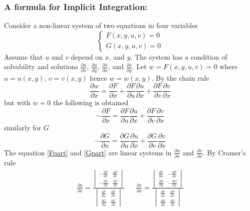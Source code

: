 \documentclass[14pt]{article}
\begin{document}
    \subsubsection{A formula for Implicit Integration:}
    Consider a non-linear system of two equations in four variables
    $$\left\{\begin{array}{lr}
        F(x,y,u,v)=0\\
        G(x,y,u,v)=0
    \end{array}\right.$$
    Assume that $u$ and $v$ depend on $x$, and $y$. The system has a condition of solvability and solutions $\frac{\partial u}{\partial x}$, $\frac{\partial u}{\partial y}$, $\frac{\partial v}{\partial x}$, and $\frac{\partial v}{\partial y}$. Let $w=F(x,y,u,v)=0$ where $u=u(x,y)$, $v=v(x,y)$ hence $w=w(x,y)$. By the chain rule
    $$\frac{\partial w}{\partial x}=\frac{\partial F}{\partial x}+\frac{\partial F}{\partial u}\frac{\partial u}{\partial x}+\frac{\partial F}{\partial v}\frac{\partial v}{\partial x}$$
    but with $w=0$ the following is obtained 
    \begin{equation}\label{Fpart}
        -\frac{\partial F}{\partial x}=\frac{\partial F}{\partial u}\frac{\partial u}{\partial x}+\frac{\partial F}{\partial v}\frac{\partial v}{\partial x}
    \end{equation}
    similarly for $G$
    \begin{equation}\label{Gpart}
        -\frac{\partial G}{\partial x}=\frac{\partial G}{\partial u}\frac{\partial u}{\partial x}+\frac{\partial G}{\partial v}\frac{\partial v}{\partial x}
    \end{equation}
    The equation \eqref{Fpart} and \eqref{Gpart} are linear systems in $\frac{\partial u}{\partial x}$ and $\frac{\partial v}{\partial x}$. By Cramer's rule
    \begin{align*}
        \frac{\partial u}{\partial x}=\frac{\begin{vmatrix}
            -\frac{\partial F}{\partial x} & \frac{\partial F}{\partial v}\\
            -\frac{\partial G}{\partial x} & \frac{\partial G}{\partial v}
        \end{vmatrix}}{\begin{vmatrix}
            \frac{\partial F}{\partial u} & \frac{\partial F}{\partial v}\\
            \frac{\partial G}{\partial u} & \frac{\partial G}{\partial v}
        \end{vmatrix}} &&
        \frac{\partial v}{\partial x}=\frac{\begin{vmatrix}
            \frac{\partial F}{\partial u} & -\frac{\partial F}{\partial x}\\
            \frac{\partial G}{\partial u} & -\frac{\partial G}{\partial x}
        \end{vmatrix}}{\begin{vmatrix}
            \frac{\partial F}{\partial u} & \frac{\partial F}{\partial v}\\
            \frac{\partial G}{\partial u} & \frac{\partial G}{\partial v}
        \end{vmatrix}}
    \end{align*}
\end{document}
